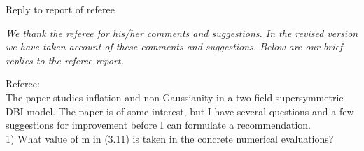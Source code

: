 \documentclass[a4paper,11pt]{article}
\begin{document}
 \begin{center}
 Reply to report of referee
  \end{center}

{\it We thank the referee for his/her comments and suggestions.
In the revised version we have taken account of these comments and suggestions.
Below are our brief replies to the referee report.}


\noindent
Referee:\\
 The paper studies inflation and non-Gaussianity in a two-field supersymmetric DBI model. The paper is of some interest, but I have several questions and a few suggestions for improvement before I can formulate a recommendation.\\
 
1) What value of m in (3.11) is taken in the concrete numerical evaluations?\\
\end{document}
